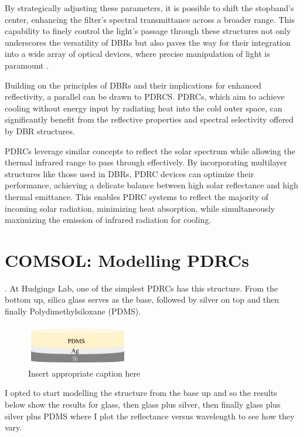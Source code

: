 By strategically adjusting these parameters, it is possible to shift the stopband's center, enhancing the filter's spectral transmittance across a broader range. This capability to finely control the light's passage through these structures not only underscores the versatility of DBRs but also paves the way for their integration into a wide array of optical devices, where precise manipulation of light is paramount \cite{pedrotti_introduction_2007}.

Building on the principles of DBRs and their implications for enhanced reflectivity, a parallel can be drawn to PDRCS. PDRCs, which aim to achieve cooling without energy input by radiating heat into the cold outer space, can significantly benefit from the reflective properties and spectral selectivity offered by DBR structures.

PDRCs leverage similar concepts to reflect the solar spectrum while allowing the thermal infrared range to pass through effectively. By incorporating multilayer structures like those used in DBRs, PDRC devices can optimize their performance, achieving a delicate balance between high solar reflectance and high thermal emittance. This enables PDRC systems to reflect the majority of incoming solar radiation, minimizing heat absorption, while simultaneously maximizing the emission of infrared radiation for cooling.

\section{COMSOL: Modelling PDRCs}.
At Hudgings Lab, one of the simplest PDRCs has this structure. From the bottom up, silica glass serves as the base, followed by silver on top and then finally Polydimethylsiloxane (PDMS).

\begin{figure}[ht!]
  \centering
  \includegraphics[width=0.4\textwidth]{Chapters/Figures/Chapter 4 Figures/PDRC Layout.png}
  \caption{Insert appropriate caption here}
  \label{fig:Insert appropriate label here}
\end{figure}

I opted to start modelling the structure from the base up and so the results below show the results for glass, then glass plus silver, then finally glass plus silver plus PDMS where I plot the reflectance versus wavelength to see how they vary.

